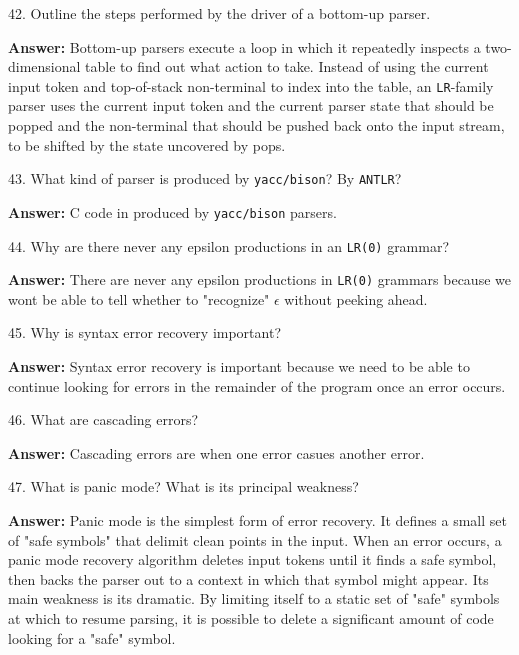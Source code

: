 42. Outline the steps performed by the driver of a bottom-up parser.

\vskip 3mm
{\bf Answer:} Bottom-up parsers execute a loop in which it repeatedly inspects a two-dimensional table to find out what action to take. Instead of using the current input token and top-of-stack non-terminal to index into the table, an {\tt LR}-family parser uses the current input token and the current parser state that should be popped and the non-terminal that should be pushed back onto the input stream, to be shifted by the state uncovered by pops.

\filbreak
\vskip 1cm

43. What kind of parser is produced by {\tt yacc/bison}? By {\tt ANTLR}?

\vskip 3mm
{\bf Answer:} C code in produced by {\tt yacc/bison} parsers.

\filbreak
\vskip 1cm

44. Why are there never any epsilon productions in an {\tt LR(0)} grammar?

\vskip 3mm
{\bf Answer:} There are never any epsilon productions in {\tt LR(0)} grammars because we wont be able to tell whether to "recognize" $\epsilon$ without peeking ahead.

\filbreak
\vskip 1cm

45. Why is syntax error recovery important?

\vskip 3mm
{\bf Answer:} Syntax error recovery is important because we need to be able to continue looking for errors in the remainder of the program once an error occurs.

\filbreak
\vskip 1cm

46. What are cascading errors?

\vskip 3mm
{\bf Answer:} Cascading errors are when one error casues another error.

\filbreak
\vskip 1cm

47. What is panic mode? What is its principal weakness?

\vskip 3mm
{\bf Answer:} Panic mode is the simplest form of error recovery. It defines a small set of "safe symbols" that delimit clean points in the input. When an error occurs, a panic mode recovery algorithm deletes input tokens until it finds a safe symbol, then backs the parser out to a context in which that symbol might appear. Its main weakness is its dramatic. By limiting itself to a static set of "safe" symbols at which to resume parsing, it is possible to delete a significant amount of code looking for a "safe" symbol.

